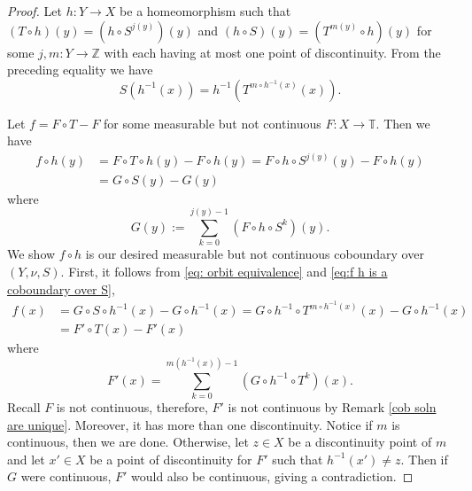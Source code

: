 \documentclass[12pt]{amsart}
\theoremstyle{definition}
\theoremstyle{plain}
\theoremstyle{definition}
\numberwithin{equation}{section}
\begin{document}
\begin{proof}
Let $h\colon Y \rightarrow X$ be a homeomorphism such that $(T\circ h)(y)=(h \circ S^{j(y)})(y)$ and $(h \circ S)(y)=(T^{m(y)} \circ h)(y)$ for some $j,m\colon Y \rightarrow \mathbb{Z}$ with each having at most one point of discontinuity. From the preceding equality we have 
\begin{equation}\label{eq: orbit equivalence}
S (h^{-1}(x))= h^{-1}(T ^{m \circ h^{-1}(x)}(x)).
\end{equation}


 Let $f=F\circ T-F$ for some measurable but not continuous $F\colon X \rightarrow \mathbb{T}.$ Then we have
\begin{equation}\label{eq:f h is a coboundary over S}
\begin{aligned}
f\circ h (y)&= F\circ T\circ h(y)-F \circ h(y)= F \circ h \circ S^{j(y)}(y)- F \circ h(y)\\ &= G \circ S(y)-G(y)
\end{aligned}
\end{equation}
where $$G(y):= \sum_{k=0}^{j(y)-1} (F \circ h \circ S^{k})(y).$$ We show $f \circ h$ is our desired measurable but not continuous coboundary over $(Y,\nu,S)$. First, it follows from \eqref{eq: orbit equivalence} and \eqref{eq:f h is a coboundary over S},
\begin{align*}
f(x)&= G \circ S \circ h^{-1} (x)-G \circ h^{-1} (x)= G \circ h^{-1} \circ T^{m \circ h^{-1}(x)}(x) - G \circ h^{-1} (x)\\ &= F' \circ T (x) - F'(x)
\end{align*}
where $${F'}(x)=\sum_{k=0}^{m(h^{-1}(x))-1} (G \circ h^{-1} \circ T^{k})(x).$$ Recall $F$ is not continuous, therefore, ${F'}$ is not continuous by Remark \ref{cob soln are unique}. Moreover, it has more than one discontinuity. Notice if $m$ is continuous, then we are done. Otherwise, let $z\in X$ be a discontinuity point of $m$ and let $x' \in X$ be a point of discontinuity for ${F'}$ such that $ h^{-1}(x') \neq z$. Then if $G$ were continuous, ${F'}$ would also be continuous, giving a contradiction. \end{proof}



\end{document}
